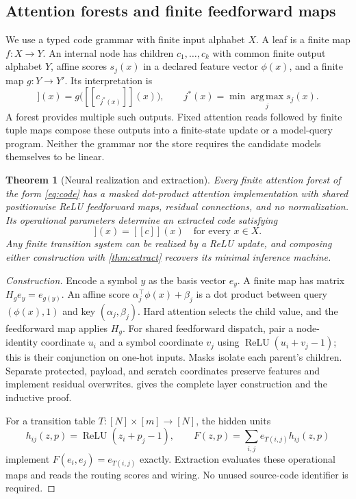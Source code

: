 \documentclass{article}
\newtheorem{theorem}{Theorem}
\theoremstyle{definition}
\newcommand{\relu}{\operatorname{ReLU}}
\newcommand{\dec}[1]{[\![#1]\!]}
\newcommand{\argmax}{\operatorname*{arg\,max}}
\newcommand{\compile}{\mathsf{compile}}
\newcommand{\extract}{\mathsf{extract}}
\begin{document}
\subsection{Attention forests and finite feedforward maps}
We use a typed code grammar with finite input alphabet $X$. A leaf is a finite map $f:X\to Y$. An internal node has children $c_1,\ldots,c_k$ with common finite output alphabet $Y$, affine scores $s_j(x)$ in a declared feature vector $\phi(x)$, and a finite map $g:Y\to Y'$. Its interpretation is
\begin{equation}
 \dec{c}(x)=g\bigl(\dec{c_{j^*(x)}}(x)\bigr),
 \qquad j^*(x)=\min\argmax_j s_j(x).
 \label{eq:code}
\end{equation}
A forest provides multiple such outputs. Fixed attention reads followed by finite tuple maps compose these outputs into a finite-state update or a model-query program. Neither the grammar nor the store requires the candidate models themselves to be linear.

\begin{theorem}[Neural realization and extraction]\label{thm:compiler}
Every finite attention forest of the form \eqref{eq:code} has a masked dot-product attention implementation with shared positionwise ReLU feedforward maps, residual connections, and no normalization. Its operational parameters determine an extracted code satisfying
\begin{equation}
 \dec{\extract(\compile(c))}(x)=\dec{c}(x)
 \quad\text{for every }x\in X.\label{eq:roundtrip}
\end{equation}
Any finite transition system can be realized by a ReLU update, and composing either construction with \cref{thm:extract} recovers its minimal inference machine.
\end{theorem}
\begin{proof}[Construction]
Encode a symbol $y$ as the basis vector $e_y$. A finite map has matrix $H_ge_y=e_{g(y)}$. An affine score $\alpha_j^\top\phi(x)+\beta_j$ is a dot product between query $(\phi(x),1)$ and key $(\alpha_j,\beta_j)$. Hard attention selects the child value, and the feedforward map applies $H_g$. For shared feedforward dispatch, pair a node-identity coordinate $u_i$ and a symbol coordinate $v_j$ using $\relu(u_i+v_j-1)$; this is their conjunction on one-hot inputs. Masks isolate each parent's children. Separate protected, payload, and scratch coordinates preserve features and implement residual overwrites.  gives the complete layer construction and the inductive proof.

For a transition table $T:[N]\times[m]\to[N]$, the hidden units
\begin{equation}
 h_{ij}(z,p)=\relu(z_i+p_j-1),\qquad
 F(z,p)=\sum_{i,j}e_{T(i,j)}h_{ij}(z,p)\label{eq:ffntable}
\end{equation}
implement $F(e_i,e_j)=e_{T(i,j)}$ exactly. Extraction evaluates these operational maps and reads the routing scores and wiring. No unused source-code identifier is required.
\end{proof}
\end{document}
